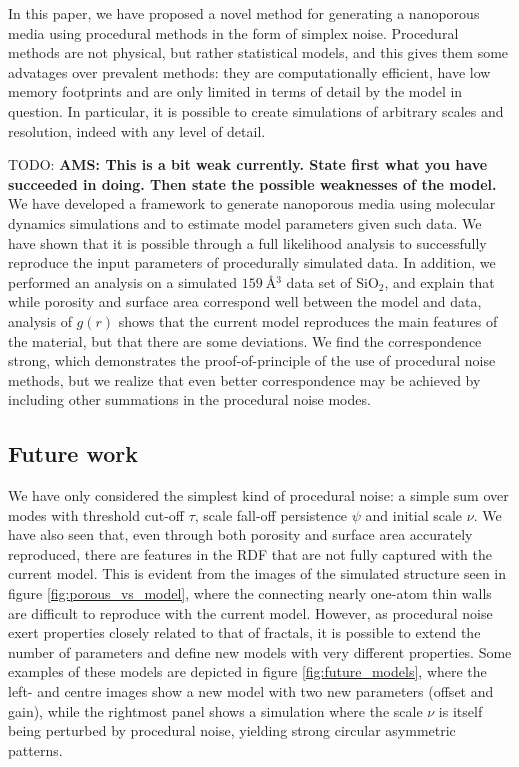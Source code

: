 \documentclass[aps,pre,twocolumn,letterpaper,floatfix,showpacs]{revtex4}
\newcommand{\todo}[1]{ {\color{Magenta} TODO: \color{Blue} \textbf{#1} }}
\begin{document}
In this paper, we have proposed a novel method for generating a nanoporous media
using procedural methods in the form of simplex noise.
Procedural methods are not physical, but rather statistical models, and this gives
them some advatages over prevalent methods: they are computationally efficient, have low memory footprints and are only limited in terms of detail by the model in question. 
In particular, it is possible to create simulations of arbitrary scales and resolution, indeed with any level of detail. 

\todo{AMS: This is a bit weak currently. State first what you have succeeded in doing.
Then state the possible weaknesses of the model.}
We have developed a framework to generate nanoporous media using molecular dynamics simulations and
to estimate model parameters given such data. 
We have shown that it is possible through a full likelihood analysis to successfully reproduce the
input parameters of procedurally simulated data. 
In addition, we performed an analysis on a simulated $\SI{159}{\angstrom^{3}}$ data set of SiO$_2$,
and explain that while porosity and surface area correspond well between the model and data,
analysis of $g(r)$ shows that the current model reproduces the main features of the material, but that there are some deviations. 
We find the correspondence strong, which demonstrates the proof-of-principle of the use of
procedural noise methods, but we realize that even better correspondence may be achieved by
including other summations in the procedural noise modes. 

\subsection{Future work}
We have only considered the simplest kind of procedural noise: a simple sum over modes with
threshold cut-off $\tau$, scale fall-off persistence $\psi$ and initial scale $\nu$. 
We have also seen that, even through both porosity and surface area accurately reproduced,
there are features in the RDF that are not fully captured with the current model. 
This is evident from the images of the simulated structure seen in figure \ref{fig:porous_vs_model},
where the connecting nearly one-atom thin walls are difficult to reproduce with the current model. 
However, as procedural noise exert properties closely related to that of fractals, it is possible
to extend the number of parameters and define new models with very different properties. 
Some examples of these models are depicted in figure \ref{fig:future_models}, where the left- and
centre images show a new model with two new parameters (offset and gain), while the rightmost panel shows a simulation where the scale $\nu$ is itself being perturbed by procedural noise, yielding strong circular asymmetric patterns.   
\end{document}
